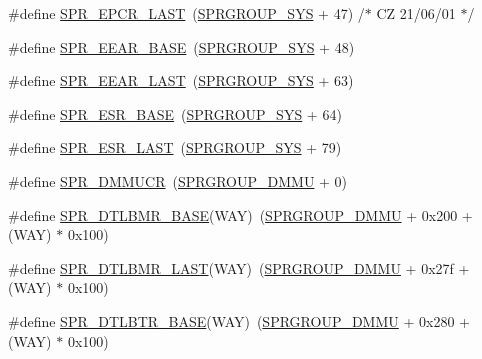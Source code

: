 \begin{DoxyCompactItemize}
\item 
\#define \hyperlink{spr-defs_8h_a609149888d7dc2787a1f9ea970f4b5fd}{\-S\-P\-R\-\_\-\-E\-P\-C\-R\-\_\-\-L\-A\-S\-T}~(\hyperlink{spr-defs_8h_a5fa75eea4be01ea7e7fb6804ab4b2774}{\-S\-P\-R\-G\-R\-O\-U\-P\-\_\-\-S\-Y\-S} + 47)  /$\ast$ \-C\-Z 21/06/01 $\ast$/
\item 
\#define \hyperlink{spr-defs_8h_a898a06f8018a524efa6eee491336e555}{\-S\-P\-R\-\_\-\-E\-E\-A\-R\-\_\-\-B\-A\-S\-E}~(\hyperlink{spr-defs_8h_a5fa75eea4be01ea7e7fb6804ab4b2774}{\-S\-P\-R\-G\-R\-O\-U\-P\-\_\-\-S\-Y\-S} + 48)
\item 
\#define \hyperlink{spr-defs_8h_a145413c7550bd91294e5221409edcf6c}{\-S\-P\-R\-\_\-\-E\-E\-A\-R\-\_\-\-L\-A\-S\-T}~(\hyperlink{spr-defs_8h_a5fa75eea4be01ea7e7fb6804ab4b2774}{\-S\-P\-R\-G\-R\-O\-U\-P\-\_\-\-S\-Y\-S} + 63)
\item 
\#define \hyperlink{spr-defs_8h_a6c501b85e16a0fc736441f7d2cccdb4b}{\-S\-P\-R\-\_\-\-E\-S\-R\-\_\-\-B\-A\-S\-E}~(\hyperlink{spr-defs_8h_a5fa75eea4be01ea7e7fb6804ab4b2774}{\-S\-P\-R\-G\-R\-O\-U\-P\-\_\-\-S\-Y\-S} + 64)
\item 
\#define \hyperlink{spr-defs_8h_aca7427e4a1276cae19a2da0200b70d4b}{\-S\-P\-R\-\_\-\-E\-S\-R\-\_\-\-L\-A\-S\-T}~(\hyperlink{spr-defs_8h_a5fa75eea4be01ea7e7fb6804ab4b2774}{\-S\-P\-R\-G\-R\-O\-U\-P\-\_\-\-S\-Y\-S} + 79)
\item 
\#define \hyperlink{spr-defs_8h_ac2812cde455c025ae4f24b3fabd37d31}{\-S\-P\-R\-\_\-\-D\-M\-M\-U\-C\-R}~(\hyperlink{spr-defs_8h_a9b7adb6ad3625a7d1f74f61b683b0a5e}{\-S\-P\-R\-G\-R\-O\-U\-P\-\_\-\-D\-M\-M\-U} + 0)
\item 
\#define \hyperlink{spr-defs_8h_a734a5f8e101cdb664fa3b415fce0c715}{\-S\-P\-R\-\_\-\-D\-T\-L\-B\-M\-R\-\_\-\-B\-A\-S\-E}(\-W\-A\-Y)~(\hyperlink{spr-defs_8h_a9b7adb6ad3625a7d1f74f61b683b0a5e}{\-S\-P\-R\-G\-R\-O\-U\-P\-\_\-\-D\-M\-M\-U} + 0x200 + (\-W\-A\-Y) $\ast$ 0x100)
\item 
\#define \hyperlink{spr-defs_8h_a1aa258ce0c3b1bfd9a8561fcaf35b096}{\-S\-P\-R\-\_\-\-D\-T\-L\-B\-M\-R\-\_\-\-L\-A\-S\-T}(\-W\-A\-Y)~(\hyperlink{spr-defs_8h_a9b7adb6ad3625a7d1f74f61b683b0a5e}{\-S\-P\-R\-G\-R\-O\-U\-P\-\_\-\-D\-M\-M\-U} + 0x27f + (\-W\-A\-Y) $\ast$ 0x100)
\item 
\#define \hyperlink{spr-defs_8h_a3a6c259c5b08e149b43236f41bc6ebd3}{\-S\-P\-R\-\_\-\-D\-T\-L\-B\-T\-R\-\_\-\-B\-A\-S\-E}(\-W\-A\-Y)~(\hyperlink{spr-defs_8h_a9b7adb6ad3625a7d1f74f61b683b0a5e}{\-S\-P\-R\-G\-R\-O\-U\-P\-\_\-\-D\-M\-M\-U} + 0x280 + (\-W\-A\-Y) $\ast$ 0x100)
\item 

\end{DoxyCompactItemize}
